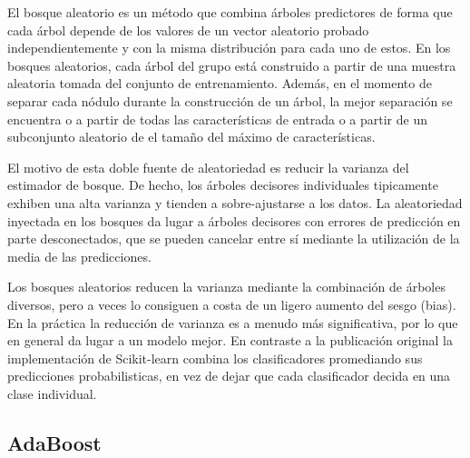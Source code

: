 El bosque aleatorio es un método que combina árboles predictores de forma que cada árbol depende de los valores de un vector aleatorio probado independientemente y con la misma distribución para cada uno de estos.
En los bosques aleatorios, cada árbol del grupo está construido a partir de una muestra aleatoria tomada del conjunto de entrenamiento.
Además, en el momento de separar cada nódulo durante la construcción de un árbol, la mejor separación se encuentra o a partir de todas las características de entrada o a partir de un subconjunto aleatorio de el tamaño del máximo de características.

El motivo de esta doble fuente de aleatoriedad es reducir la varianza del estimador de bosque.
De hecho, los árboles decisores individuales tipicamente exhiben una alta varianza y tienden a sobre-ajustarse a los datos.
La aleatoriedad inyectada en los bosques da lugar a árboles decisores con errores de predicción en parte desconectados, 
que se pueden cancelar entre sí mediante la utilización de la media de las predicciones.

Los bosques aleatorios reducen la varianza mediante la combinación de árboles diversos, pero a veces lo consiguen a costa de un ligero aumento del sesgo (bias).
En la práctica la reducción de varianza es a menudo más significativa, por lo que en general da lugar a un modelo mejor.
En contraste a la publicación original %
la implementación de Scikit-learn combina los clasificadores promediando sus predicciones probabilisticas, en vez de dejar que cada clasificador decida en una clase individual.

\subsection{AdaBoost}


